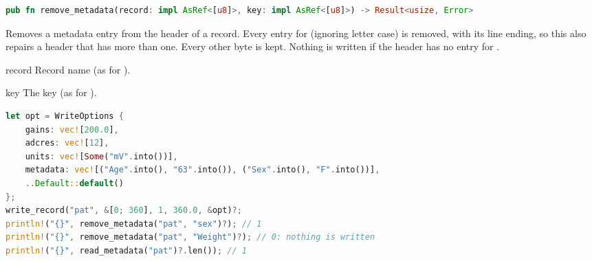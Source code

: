 \begin{lstlisting}[language=Rust,style=signature]
pub fn remove_metadata(record: impl AsRef<[u8]>, key: impl AsRef<[u8]>) -> Result<usize, Error>
\end{lstlisting}
Removes a metadata entry from the header of a record. Every entry for 
(ignoring letter case) is removed, with its line ending, so this also repairs a header
that has more than one. Every other byte is kept. Nothing is written if the header has no
entry for .
\begin{params}
\item[record] Record name (as for ).
\item[key] The key (as for ).
\end{params}
\begin{lstlisting}[language=Rust,style=example]
let opt = WriteOptions {
    gains: vec![200.0],
    adcres: vec![12],
    units: vec![Some("mV".into())],
    metadata: vec![("Age".into(), "63".into()), ("Sex".into(), "F".into())],
    ..Default::default()
};
write_record("pat", &[0; 360], 1, 360.0, &opt)?;
println!("{}", remove_metadata("pat", "sex")?); // 1
println!("{}", remove_metadata("pat", "Weight")?); // 0: nothing is written
println!("{}", read_metadata("pat")?.len()); // 1
\end{lstlisting}


